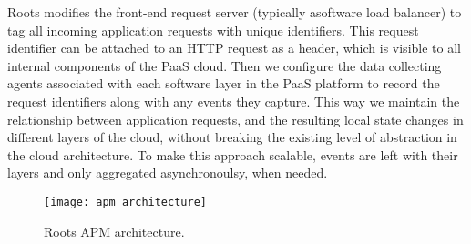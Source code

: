 Roots modifies the front-end request server (typically asoftware load
balancer) 
to tag all incoming application requests with unique identifiers.
This request identifier can be attached to an HTTP request as a header, which is visible to all 
internal components of the PaaS cloud. Then we configure the data collecting
agents associated with each software layer in the PaaS 
platform to record the request identifiers along with any events they capture. 
This way we maintain the relationship between application requests, and the resulting
local state changes in different layers of the cloud, without breaking the existing level
of abstraction in the cloud architecture. 
To make this approach scalable, events are left with their layers and only
aggregated asynchronoulsy, when needed.
%
%
\begin{figure}
\centering
\texttt{[image: apm\_architecture]}
\caption{Roots APM architecture.}
\label{fig:apm_architecture}
\end{figure}
%

